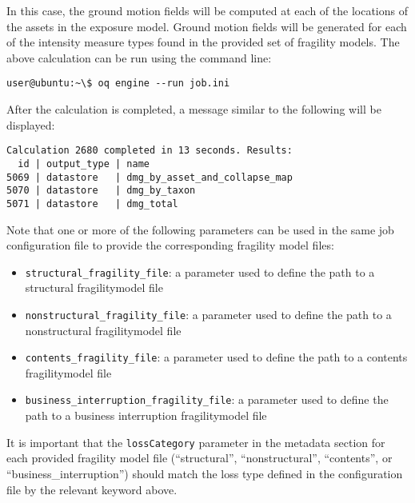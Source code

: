 In this case, the ground motion fields will be computed at each of the
locations of the assets in the exposure model. Ground motion fields will be
generated for each of the intensity measure types found in the provided set of
fragility models. The above calculation can be run using the command line:

\begin{verbatim}
user@ubuntu:~\$ oq engine --run job.ini
\end{verbatim}

After the calculation is completed, a message similar to the following will be
displayed:

\begin{verbatim}
Calculation 2680 completed in 13 seconds. Results:
  id | output_type | name
5069 | datastore   | dmg_by_asset_and_collapse_map
5070 | datastore   | dmg_by_taxon
5071 | datastore   | dmg_total
\end{verbatim}

Note that one or more of the following parameters can be used in the same job
configuration file to provide the corresponding fragility model files:

\begin{itemize}

  \item \Verb+structural_fragility_file+: a parameter used to define the path
    to a structural \gls{fragilitymodel} file

  \item \Verb+nonstructural_fragility_file+: a parameter used to define the path
    to a nonstructural \gls{fragilitymodel} file

  \item \Verb+contents_fragility_file+: a parameter used to define the path
    to a contents \gls{fragilitymodel} file

  \item \Verb+business_interruption_fragility_file+: a parameter used to define
    the path to a business interruption \gls{fragilitymodel} file

\end{itemize}

It is important that the \Verb+lossCategory+ parameter in the metadata section
for each provided fragility model file (``structural'', ``nonstructural'',
``contents'', or ``business\_interruption'') should match the loss type
defined in the configuration file by the relevant keyword above.


